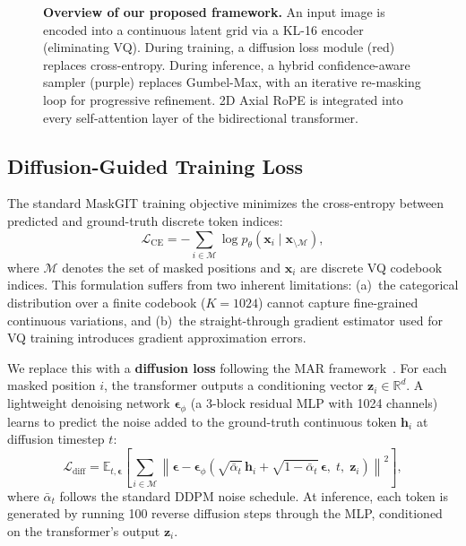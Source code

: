 \documentclass[conference]{IEEEtran}
\begin{document}
\begin{figure}[!t]
\caption{\textbf{Overview of our proposed framework.} An input image is encoded into a continuous latent grid via a KL-16 encoder (eliminating VQ). During training, a diffusion loss module (red) replaces cross-entropy. During inference, a hybrid confidence-aware sampler (purple) replaces Gumbel-Max, with an iterative re-masking loop for progressive refinement. 2D Axial RoPE is integrated into every self-attention layer of the bidirectional transformer.}
\label{fig:pipeline}
\end{figure}

\subsection{Diffusion-Guided Training Loss}
\label{subsec:diffloss}

The standard MaskGIT training objective minimizes the cross-entropy between predicted and ground-truth discrete token indices:
\begin{equation}
\mathcal{L}_{\text{CE}} = -\sum_{i \in \mathcal{M}} \log p_\theta(\mathbf{x}_i \mid \mathbf{x}_{\setminus \mathcal{M}}),
\label{eq:ce_loss}
\end{equation}
where $\mathcal{M}$ denotes the set of masked positions and $\mathbf{x}_i$ are discrete VQ codebook indices. This formulation suffers from two inherent limitations: (a)~the categorical distribution over a finite codebook ($K{=}1024$) cannot capture fine-grained continuous variations, and (b)~the straight-through gradient estimator used for VQ training introduces gradient approximation errors.

We replace this with a \textbf{diffusion loss} following the MAR framework~\cite{li2024mar}. For each masked position $i$, the transformer outputs a conditioning vector $\mathbf{z}_i \in \mathbb{R}^d$. A lightweight denoising network $\boldsymbol{\epsilon}_\phi$ (a 3-block residual MLP with 1024 channels) learns to predict the noise added to the ground-truth continuous token $\mathbf{h}_i$ at diffusion timestep $t$:
\begin{equation}
\mathcal{L}_{\text{diff}} = \mathbb{E}_{t, \boldsymbol{\epsilon}} \left[ \sum_{i \in \mathcal{M}} \left\| \boldsymbol{\epsilon} - \boldsymbol{\epsilon}_\phi\!\left(\sqrt{\bar{\alpha}_t}\,\mathbf{h}_i + \sqrt{1-\bar{\alpha}_t}\,\boldsymbol{\epsilon},\; t,\; \mathbf{z}_i\right) \right\|^2 \right],
\label{eq:diff_loss}
\end{equation}
where $\bar{\alpha}_t$ follows the standard DDPM noise schedule. At inference, each token is generated by running 100 reverse diffusion steps through the MLP, conditioned on the transformer's output $\mathbf{z}_i$.
\end{document}
